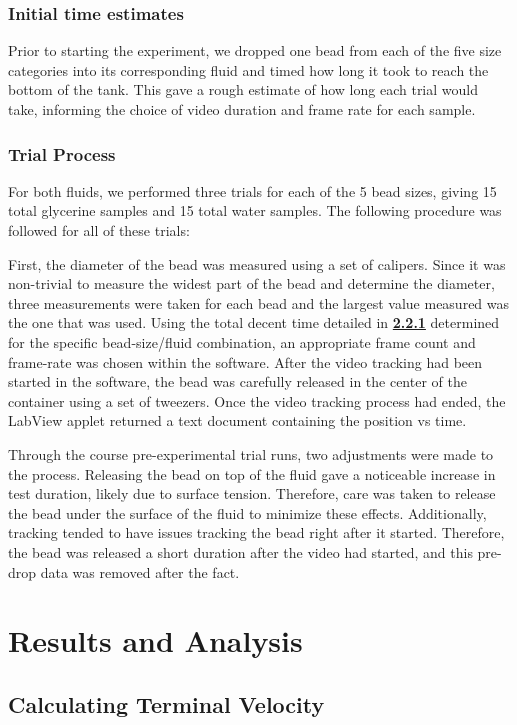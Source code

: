 \documentclass[
	letterpaper
	12pt
]{template}
\newcommand{\bref}[2]{\textbf{\hyperref[#1]{#2}}}
\begin{document}
\subsubsection{Initial time estimates}\label{sec::timeEst}
Prior to starting the experiment, we dropped one bead from each of the five size categories into its corresponding fluid and timed how long it took to reach the bottom of the tank. This gave a rough estimate of how long each trial would take, informing the choice of video duration and frame rate for each sample.
\subsubsection{Trial Process}
For both fluids, we performed three trials for each of the 5 bead sizes, giving 15 total glycerine samples and 15 total water samples. The following procedure was followed for all of these trials: \vspace{\baselineskip}

First, the diameter of the bead was measured using a set of calipers. Since it was non-trivial to measure the widest part of the bead and determine the diameter, three measurements were taken for each bead and the largest value measured was the one that was used. Using the total decent time detailed in \bref{sec::timeEst}{2.2.1} determined for the specific bead-size/fluid combination, an appropriate frame count and frame-rate was chosen within the software. After the video tracking had been started in the software, the bead was carefully released in the center of the container using a set of tweezers. Once the video tracking process had ended, the LabView applet returned a text document containing the position vs time.
\vspace{\baselineskip}

Through the course pre-experimental trial runs, two adjustments were made to the process. Releasing the bead on top of the fluid gave a noticeable increase in test duration, likely due to surface tension. Therefore, care was taken to release the bead under the surface of the fluid to minimize these effects. Additionally, tracking tended to have issues tracking the bead right after it started. Therefore, the bead was released a short duration after the video had started, and this pre-drop data was removed after the fact.
\section{Results and Analysis}
\subsection{Calculating Terminal Velocity}
\end{document}
